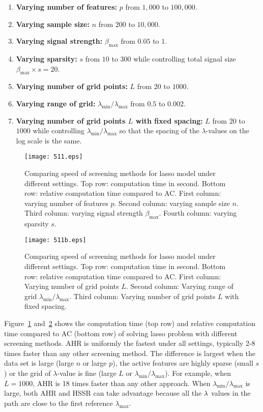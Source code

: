 \begin{enumerate}
    \item \textbf{Varying number of features:} $p$ from $1,000$ to $100,000$.
    \item \textbf{Varying sample size:} $n$ from $200$ to $10,000$.
    \item \textbf{Varying signal strength:} $\beta_{\max}$ from $0.05$ to $1$.
    \item \textbf{Varying sparsity:} $s$ from $10$ to $300$ while controlling total signal size $\beta_{\max}\times s=20$.
    \item \textbf{Varying number of grid points:}  $L$ from $20$ to $1000$.
    \item \textbf{Varying range of grid:}  $\lambda_{\min}/\lambda_{\max}$ from $0.5$ to $0.002$.
    \item \textbf{Varying number of grid points $L$ with fixed spacing:} $L$ from $20$ to $1000$ while controlling $\lambda_{\min}/\lambda_{\max}$ so that the spacing of the $\lambda$-values on the log scale is the same.
\end{enumerate}

\begin{figure}[h]
    \centering
    \texttt{[image: 511.eps]}    \caption{Comparing speed of screening methods for lasso model under different settings. Top row: computation time in second. Bottom row: relative computation time compared to AC. First column: varying number of features $p$. Second column: varying sample size $n$. Third column: varying signal strength $\beta_{\max}$. Fourth column: varying sparsity $s$.}
    \label{fig:5.1.1a}
\end{figure}

\begin{figure}[h]
    \centering
    \texttt{[image: 511b.eps]}    \caption{Comparing speed of screening methods for lasso model under different settings. Top row: computation time in second. Bottom row: relative computation time compared to AC. First column: Varying number of grid points $L$. Second column: Varying range of grid $\lambda_{\min}/\lambda_{\max}$. Third column: Varying number of grid points $L$ with fixed spacing.}
    \label{fig:5.1.1b}
\end{figure}

Figure~\ref{fig:5.1.1a} and~\ref{fig:5.1.1b} shows the computation time (top row) and relative computation time compared to AC (bottom row) of solving lasso problem with different screening methods. AHR is uniformly the fastest under all settings, typically 2-8 times faster than any other screening method. The difference is largest when the data set is large (large $n$ or large $p$), the active features are highly sparse (small $s$) or the grid of $\lambda$-value is fine (large $L$ or $\lambda_{\min}/\lambda_{\max}$). For example, when $L=1000$, AHR is 18 times faster than any other approach. When $\lambda_{\min}/\lambda_{\max}$ is large, both AHR and HSSR can take advantage because all the $\lambda$ values in the path are close to the first reference $\lambda_{\max}$.

